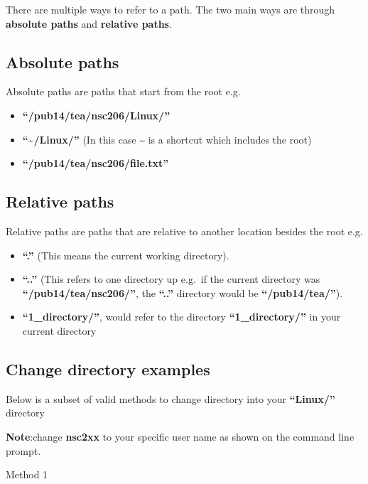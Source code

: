 \documentclass[
  letterpaper,
  DIV=11,
  numbers=noendperiod]{scrreprt}
\providecommand{\tightlist}{%
  \setlength{\itemsep}{0pt}\setlength{\parskip}{0pt}}
\begin{document}
There are multiple ways to refer to a path. The two main ways are
through \textbf{absolute paths} and \textbf{relative paths}.

\subsection{Absolute paths}\label{absolute-paths}

Absolute paths are paths that start from the root e.g.

\begin{itemize}
\tightlist
\item
  \textbf{``/pub14/tea/nsc206/Linux/''}
\item
  \textbf{``\textasciitilde/Linux/''} (In this case \textasciitilde{} is
  a shortcut which includes the root)
\item
  \textbf{``/pub14/tea/nsc206/file.txt''}
\end{itemize}

\subsection{Relative paths}\label{relative-paths}

Relative paths are paths that are relative to another location besides
the root e.g.

\begin{itemize}
\tightlist
\item
  \textbf{``.''} (This means the current working directory).
\item
  \textbf{``..''} (This refers to one directory up e.g.~if the current
  directory was \textbf{``/pub14/tea/nsc206/''}, the \textbf{``..''}
  directory would be \textbf{``/pub14/tea/''}).
\item
  \textbf{``1\_directory/''}, would refer to the directory
  \textbf{``1\_directory/''} in your current directory
\end{itemize}

\subsection{Change directory examples}\label{change-directory-examples}

Below is a subset of valid methods to change directory into your
\textbf{``Linux/''} directory

\textbf{Note}:change \textbf{nsc2xx} to your specific user name as shown
on the command line prompt.

Method 1
\end{document}
